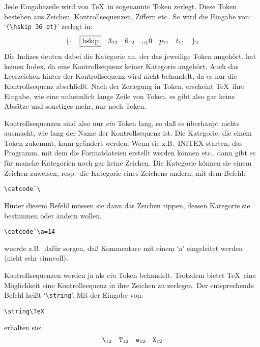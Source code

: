 Jede Eingabezeile wird von \TeX\ in sogenannte Token zerlegt. Diese
Token bestehen aus Zeichen, Kontrollsequenzen, 
Ziffern etc.\ So wird
die Eingabe von: 
`\verb|{\hskip 36 pt}|' zerlegt in:
\[\{_1\quad\mbox{\fbox{hskip}}\quad 3_{12}\quad
6_{12}\quad\mbox{\tt\char32}_10\quad p_{11}\quad t_{11}\quad \}_2\]
Die Indizes deuten dabei die 
Kategorie an, der das jeweilige Token
angeh\"ort.  hat keinen Index, da eine
Kontrollsequenz
keiner Kategorie angeh\"ort. Auch das 
Leerzeichen hinter der
Kontrollsequenz wird nicht behandelt, da es nur die Kontrollsequenz
abschlie\ss{}t. Nach der Zerlegung in Token, erscheint \TeX\ ihre Eingabe,
wie eine unheimlich lange Zeile von Token, es gibt also gar keine
Abs\"atze und sonstiges mehr, nur noch Token.

Kontrollsequenzen sind also nur {\em ein} Token lang, so da\ss{} es
\"uberhaupt nichts ausmacht, wie lang der Name der Kontrollsequenz ist.
Die Kategorie, die einem Token zukommt, kann ge\"andert werden. Wenn sie
z.B.\ INITEX starten, das Programm, mit dem die Formatdateien erstellt
werden k\"onnen etc., dann gibt es f\"ur manche Kategorien noch gar keine
Zeichen. Die Kategorie k\"onnen sie einem Zeichen zuweisen, resp.\ die
Kategorie eines Zeichens andern, mit dem Befehl:
\begin{verbatim}
\catcode`\
\end{verbatim}
Hinter diesem Befehl m\"ussen sie dann das Zeichen tippen, dessen
\index{Kategorie!Aendern@Kategorie!\"Andern}
Kategorie sie bestimmen oder \"andern wollen.
\begin{verbatim}
\catcode`\a=14
\end{verbatim}
wuerde z.B.\ daf\"ur sorgen, da\ss{} 
Kommentare mit einem `a' eingeleitet
werden (nicht sehr sinnvoll).

Kontrollsequenzen werden ja als {\em ein} Token behandelt. Trotzdem
bietet \TeX\ eine M\"oglichkeit eine Kontrollsequenz in ihre Zeichen zu
zerlegen. Der entsprechende Befehl hei\ss{}t 
`\verb|\string|'. Mit der
Eingabe von:
\begin{verbatim}
\string\TeX
\end{verbatim}
erhalten sie:
\[ \mbox{\tt\char92}_{12}\quad \mbox{\tt T}_{12}\quad \mbox{\tt
e}_{12}\quad \mbox{\tt X}_{12}\]

